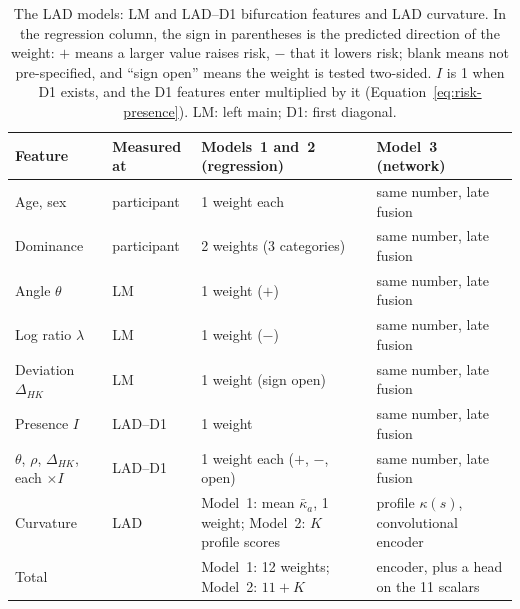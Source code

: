 \begin{table}[tbp]
  \centering
  \small
  \newcommand{\fused}{same number, late fusion}
  \caption{The LAD models: LM and LAD--D1 bifurcation features and LAD curvature.
    In the regression column, the sign in parentheses is the predicted direction of the weight: $+$ means a larger value raises risk, $-$ that it lowers risk; blank means not pre-specified, and ``sign open'' means the weight is tested two-sided.
    $I$ is 1 when D1 exists, and the D1 features enter multiplied by it (Equation~\ref{eq:risk-presence}).
    LM: left main; D1: first diagonal.}
  \label{tab:risk-lad}
  \begin{tabular}{@{}p{3.3cm}p{1.9cm}p{4.0cm}p{5.0cm}@{}}
    \toprule
    Feature & Measured at & Models~1 and~2 (regression) & Model~3 (network) \\
    \midrule
    Age, sex & participant & 1 weight each & \fused \\
    Dominance & participant & 2 weights (3 categories) & \fused \\
    Angle $\theta$ & LM & 1 weight ($+$) & \fused \\
    Log ratio $\lambda$ & LM & 1 weight ($-$) & \fused \\
    Deviation $\Delta_{HK}$ & LM & 1 weight (sign open) & \fused \\
    Presence $I$ & LAD--D1 & 1 weight & \fused \\
    $\theta$, $\rho$, $\Delta_{HK}$, each $\times I$ & LAD--D1 & 1 weight each ($+$, $-$, open) & \fused \\
    Curvature & LAD & Model~1: mean $\bar\kappa_a$, 1 weight; Model~2: $K$ profile scores & profile $\kappa(s)$, convolutional encoder \\
    \midrule
    Total & & Model~1: 12 weights; Model~2: $11 + K$ & encoder, plus a head on the 11 scalars \\
    \bottomrule
  \end{tabular}


\end{table}
